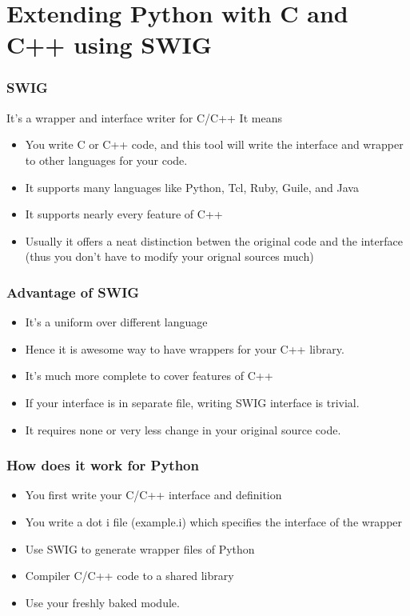 \documentclass{beamer}
\begin{document}
\section{Extending Python with C and C++ using SWIG}
\label{sec-3}
\begin{frame}
\frametitle{SWIG}
\label{sec-3_1}

   It's a wrapper and interface writer for C/C++
   It means

\begin{itemize}
\item You write C or C++ code, and this tool will write the interface and wrapper to other languages for your code.
\item It supports many languages like Python, Tcl, Ruby, Guile, and Java
\item It supports nearly every feature of C++
\item Usually it offers a neat distinction betwen the original code and the interface (thus you don't have to modify your orignal sources much)
\end{itemize}
\end{frame}
\begin{frame}
\frametitle{Advantage of SWIG}
\label{sec-3_2}


\begin{itemize}
\item It's a uniform over different language
\item Hence it is awesome way to have wrappers for your C++ library.
\item It's much more complete to cover features of C++
\item If your interface is in separate file, writing SWIG interface is trivial.
\item It requires none or very less change in your original source code.
\end{itemize}
\end{frame}
\begin{frame}
\frametitle{How does it work for Python}
\label{sec-3_3}


\begin{itemize}
\item You first write your C/C++ interface and definition
\item You write a dot i file (example.i) which specifies the interface of the wrapper
\item Use SWIG to generate wrapper files of Python
\item Compiler C/C++ code to a shared library
\item Use your freshly baked module.
\end{itemize}
\end{frame}
\end{document}
